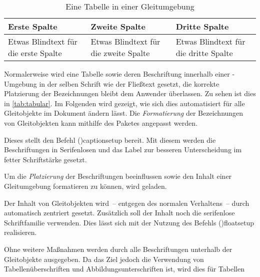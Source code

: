 \documentclass[%
  english,ngerman,%
  cdgeometry=no,DIV=12,%
  cd=false,cdfont=false,cdtitle=true,%
  headings=normal,%
  automark,%
  listof=toc,%
]{tudscrartcl}
\begin{document}
\newcommand*\tableexample[1][]{%
  \begin{tabularx}{.75\textwidth}{@{}XXX@{}}
  \toprule
  \textbf{Erste Spalte} & \textbf{Zweite Spalte} & 
  \textbf{Dritte Spalte} \tabularnewline\midrule
  Etwas Blindtext für die erste Spalte &
  Etwas Blindtext für die zweite Spalte &
  Etwas Blindtext für die dritte Spalte
  \tabularnewline\bottomrule
  \end{tabularx}
  #1%
}
\begin{table}
\tableexample[%
  \caption{%
    Eine Tabelle in einer Gleitumgebung%
    \label{tab:tabular}%
  }%
]
\end{table}

Normalerweise wird eine Tabelle sowie deren Beschriftung innerhalb einer 
-Umgebung in der selben Schrift wie der Fließtext 
gesetzt, die korrekte Platzierung der Bezeichnungen bleibt dem Anwender 
überlassen. Zu sehen ist dies in \autoref{tab:tabular}. Im Folgenden wird 
gezeigt, wie sich dies automatisiert für alle Gleitobjekte im Dokument ändern 
lässt. Die \emph{Formatierung} der Bezeichnungen von Gleitobjekten kann 
mithilfe des Paketes  angepasst werden.
%
\begin{Preamble}
\usepackage{caption}
\end{Preamble}
%
Dieses stellt den Befehl \Macro(){captionsetup} bereit. Mit 
diesem werden die Beschriftungen in Serifenlosen und das Label zur besseren 
Unterscheidung im fetter Schriftstärke gesetzt.
%
\begin{Preamble*}
\captionsetup{font=sf,labelfont=bf,labelsep=space}
\end{Preamble*}
%
Um die \emph{Platzierung} der Beschriftungen beeinflussen sowie den Inhalt 
einer Gleitumgebung formatieren zu können, wird  geladen. 
\begin{Preamble}
\usepackage{floatrow}
\end{Preamble}
%
Der Inhalt von Gleitobjekten wird~-- entgegen des normalen Verhaltens~-- durch 
 automatisch zentriert gesetzt. Zusätzlich soll der Inhalt 
noch die serifenlose Schriftfamilie verwenden. Dies lässt sich mit der Nutzung 
des Befehls \Macro(){floatsetup} realisieren.
%
\begin{Preamble*}
\end{Preamble*}
%
Ohne weitere Maßnahmen werden durch  alle Beschriftungen 
unterhalb der Gleitobjekte ausgegeben. Da das Ziel jedoch die Verwendung von 
Tabellenüberschriften und Abbildungsunterschriften ist, wird dies für Tabellen
\end{document}
